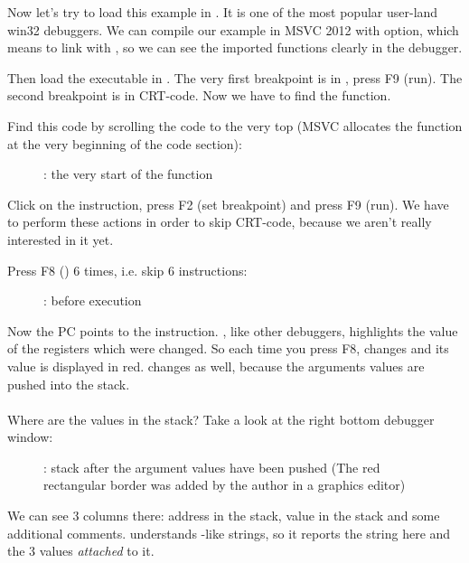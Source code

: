 Now let's try to load this example in \olly.
It is one of the most popular user-land win32 debuggers.
We can compile our example in MSVC 2012 with  option, which means to link with ,
so we can see the imported functions clearly in the debugger.

Then load the executable in \olly.
The very first breakpoint is in , press 
F9 (run).
The second breakpoint is in \ac{CRT}-code.
Now we have to find the \main function.

Find this code by scrolling the code to the very top (MSVC allocates the \main function at the very beginning of the code section): 
\begin{figure}[H]
\centering
{}
\caption{\olly: the very start of the \main function}
\label{fig:printf3_olly_1}
\end{figure}

Click on the  instruction, press F2 (set breakpoint) and press F9 (run).
We have to perform these actions in order to skip \ac{CRT}-code, because we aren't really interested in it yet.

\clearpage
Press F8 (\stepover) 6 times, i.e. skip 6 instructions:

\begin{figure}[H]
\centering
{}
\caption{\olly: before \printf execution}
\label{fig:printf3_olly_2}
\end{figure}

Now the \ac{PC} points to the  instruction.
\olly, like other debuggers, highlights the value of the registers which were changed.
So each time you press F8, \EIP changes and its value is displayed in red.
\ESP changes as well, because the arguments values are pushed into the stack.\\
\\
Where are the values in the stack?
Take a look at the right bottom debugger window:

\begin{figure}[H]
\centering

\caption{\olly: stack after the argument values have been pushed (The red rectangular border was added by the author in a graphics editor)}
\end{figure}

We can see 3 columns there: address in the stack, value in the stack and some additional \olly comments. 
\olly understands \printf{}-like strings, so it reports the string here and the 3 values \emph{attached} to it.

